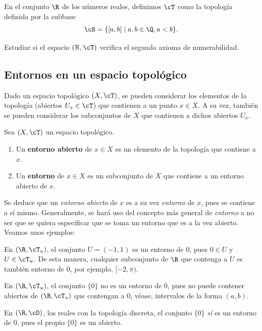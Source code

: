 \begin{ex}
    \hypertarget{2026 S 3}{}
    En el conjunto \(\R\) de los números reales, definimos \(\cT\) como la topología definida por la subbase \[\cS = \{[a,b] \mid a, b \in \Q, a < b\}.\]

    Estudiar si el espacio \((\mathbb{R}, \cT)\) verifica el segundo axioma de numerabilidad.
\end{ex}


\subsection*{Entornos en un espacio topológico}

Dado un espacio topológico $(X,\cT)$, se pueden considerar los elementos de la topología (abiertos $U_x\in\cT$) que contienen a un punto $x\in X$. A su vez, también se pueden considerar los subconjuntos de $X$ que contienen a dichos abiertos $U_x$.

\begin{deff}
    Sea $(X,\cT)$ un espacio topológico.
    \begin{enumerate}[label=--,itemsep=0pt, leftmargin=15pt]
        \item Un {\bf entorno abierto} de $x\in X$ es un elemento de la topología que contiene a $x$.
        \item Un {\bf entorno} de $x\in X$ es un subconjunto de $X$ que contiene a un entorno abierto de $x$.
    \end{enumerate}
\end{deff}

Se deduce que un {\it entorno abierto} de $x$ es a su vez {\it entorno} de $x$, pues se contiene a sí mismo. Generalmente, se hará uso del concepto más general de {\it entorno} a no ser que se quiera especificar que se toma un entorno que es a la vez abierto. Veamos unos ejemplos:

\begin{ejs}
    \item En $(\R,\cT_u)$, el conjunto $U = (-1,1)$ es un entorno de $0$, pues $0\in U$ y $U\in\cT_u$. De esta manera, cualquier subconjunto de $\R$ que contenga a $U$ es también entorno de $0$, por ejemplo, $[-2,\pi)$.
    \item En $(\R,\cT_u)$, el conjunto $\{0\}$ no es un entorno de $0$, pues no puede contener abiertos de $(\R,\cT_u)$ que contengan a $0$, véase, intervalos de la forma $(a,b)$.
    \item En $(\R, \cD)$, los reales con la topología discreta, el conjunto $\{0\}$ {\it sí} es un entorno de $0$, pues el propio $\{0\}$ es un abierto.
\end{ejs}


